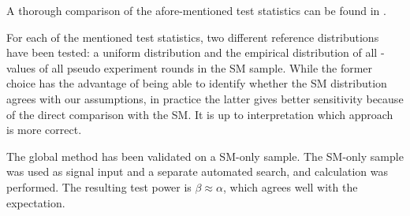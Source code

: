 A thorough comparison of the afore-mentioned test statistics can be found in \cite{Stephens:EDFstatisticsgoodness}.

For each of the mentioned test statistics, two different reference distributions have been tested: a uniform distribution and the empirical distribution of all \ptilde-values of all pseudo experiment rounds in the \ac{SM} sample.
While the former choice has the advantage of being able to identify whether the \ac{SM} distribution agrees with our assumptions, in practice the latter gives better sensitivity because of the direct comparison with the \ac{SM}. It is up to interpretation which approach is more correct.

The global method has been validated on a \ac{SM}-only sample. The \ac{SM}-only sample was used as signal input and a separate automated search, \ptilde and \phat calculation was performed. 
The resulting test power is $\beta \approx \alpha$, which agrees well with the expectation.


%
%
%
%
%
%
%
%
%
%
%
